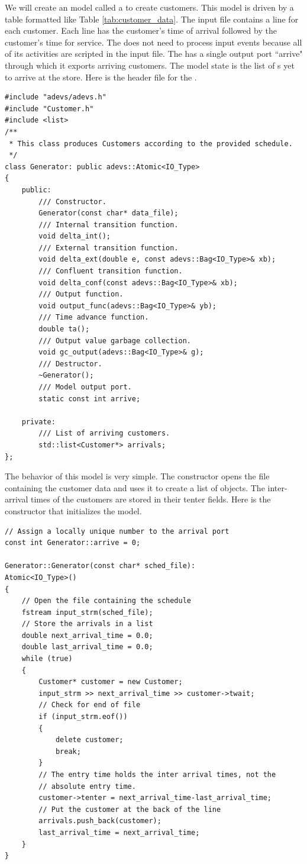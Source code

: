 We will create an  model called a  to create customers. This model is driven by a table formatted like Table \ref{tab:customer_data}. The input file contains a line for each customer. Each line has the customer's time of arrival followed by the customer's time for service. The  does not need to process input events because all of its activities are scripted in the input file. The  has a single output port ``arrive" through which it exports arriving customers. The model state is the list of s yet to arrive at the store. Here is the header file for the .
\begin{verbatim}
#include "adevs/adevs.h"
#include "Customer.h"
#include <list>
/**
 * This class produces Customers according to the provided schedule.
 */
class Generator: public adevs::Atomic<IO_Type>
{
    public:
        /// Constructor.
        Generator(const char* data_file);
        /// Internal transition function.
        void delta_int();
        /// External transition function.
        void delta_ext(double e, const adevs::Bag<IO_Type>& xb);
        /// Confluent transition function.
        void delta_conf(const adevs::Bag<IO_Type>& xb);
        /// Output function.
        void output_func(adevs::Bag<IO_Type>& yb);
        /// Time advance function.
        double ta();
        /// Output value garbage collection.
        void gc_output(adevs::Bag<IO_Type>& g);
        /// Destructor.
        ~Generator();
        /// Model output port.
        static const int arrive;

    private:
        /// List of arriving customers.
        std::list<Customer*> arrivals;
};
\end{verbatim}

The behavior of this model is very simple. The constructor opens the file containing the customer data and uses it to create a list of  objects. The inter-arrival times of the customers are stored in their tenter fields. Here is the constructor that initializes the model.
\begin{verbatim}
// Assign a locally unique number to the arrival port
const int Generator::arrive = 0;

Generator::Generator(const char* sched_file):
Atomic<IO_Type>()
{
    // Open the file containing the schedule
    fstream input_strm(sched_file);
    // Store the arrivals in a list
    double next_arrival_time = 0.0;
    double last_arrival_time = 0.0;
    while (true)
    {
        Customer* customer = new Customer;
        input_strm >> next_arrival_time >> customer->twait;
        // Check for end of file
        if (input_strm.eof())
        {
            delete customer;
            break;
        }
        // The entry time holds the inter arrival times, not the
        // absolute entry time.
        customer->tenter = next_arrival_time-last_arrival_time;
        // Put the customer at the back of the line
        arrivals.push_back(customer);
        last_arrival_time = next_arrival_time;
    }
}
\end{verbatim}

